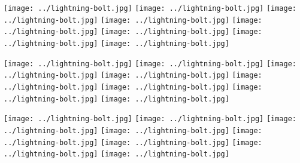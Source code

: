 \documentclass[11pt] {article}
\begin{document}
\begin{landscape}

\texttt{[image: ../lightning-bolt.jpg]}
\texttt{[image: ../lightning-bolt.jpg]}
\texttt{[image: ../lightning-bolt.jpg]}
\texttt{[image: ../lightning-bolt.jpg]}
\texttt{[image: ../lightning-bolt.jpg]}
\texttt{[image: ../lightning-bolt.jpg]}
\texttt{[image: ../lightning-bolt.jpg]}
\texttt{[image: ../lightning-bolt.jpg]}

\texttt{[image: ../lightning-bolt.jpg]}
\texttt{[image: ../lightning-bolt.jpg]}
\texttt{[image: ../lightning-bolt.jpg]}
\texttt{[image: ../lightning-bolt.jpg]}
\texttt{[image: ../lightning-bolt.jpg]}
\texttt{[image: ../lightning-bolt.jpg]}
\texttt{[image: ../lightning-bolt.jpg]}
\texttt{[image: ../lightning-bolt.jpg]}

\texttt{[image: ../lightning-bolt.jpg]}
\texttt{[image: ../lightning-bolt.jpg]}
\texttt{[image: ../lightning-bolt.jpg]}
\texttt{[image: ../lightning-bolt.jpg]}
\texttt{[image: ../lightning-bolt.jpg]}
\texttt{[image: ../lightning-bolt.jpg]}
\texttt{[image: ../lightning-bolt.jpg]}
\texttt{[image: ../lightning-bolt.jpg]}

\end{landscape}
\end{document}
